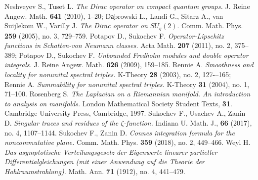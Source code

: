\documentclass{article}
\begin{document}
\begin{thebibliography}{99}
 Neshveyev S., Tuset L. {\it The Dirac operator on compact quantum groups.} J. Reine Angew. Math. {\bf 641} (2010), 1--20; Da̧browski L., Landi G., Sitarz A., van Suijlekom W., Varilly J. {\it The Dirac operator on $SU_q(2).$} Comm. Math. Phys. {\bf 259} (2005), no. 3, 729--759.
 Potapov D., Sukochev F. {\it Operator-Lipschitz functions in Schatten-von Neumann classes.} Acta Math. {\bf 207} (2011), no. 2, 375--389; Potapov D., Sukochev F. {\it Unbounded Fredholm modules and double operator integrals.} J. Reine Angew. Math. {\bf 626} (2009), 159--185.
 Rennie A. {\it Smoothness and locality for nonunital spectral triples.} K-Theory {\bf 28} (2003), no. 2, 127-–165; Rennie A. {\it Summability for nonunital spectral triples. } K-Theory {\bf 31} (2004), no. 1, 71--100.
 Rosenberg S. {\it The Laplacian on a Riemannian manifold. An introduction to analysis on manifolds.} London Mathematical Society Student Texts, {\bf 31}. Cambridge University Press, Cambridge, 1997.
 Sukochev F., Usachev A., Zanin D. {\it Singular traces and residues of the $\zeta$-function.} Indiana U. Math. J., {\bf 66} (2017), no. 4, 1107--1144.
 Sukochev F., Zanin D. {\it Connes integration formula for the noncommutative plane.} Comm. Math. Phys. {\bf 359} (2018), no. 2, 449--466.
 Weyl H. {\it Das asymptotische Verteilungsgesetz der Eigenwerte linearer partieller Differentialgleichungen (mit einer Anwendung auf die Theorie der Hohlraumstrahlung).} Math. Ann. {\bf 71} (1912), no. 4, 441--479. 

\end{thebibliography}
\end{document}

